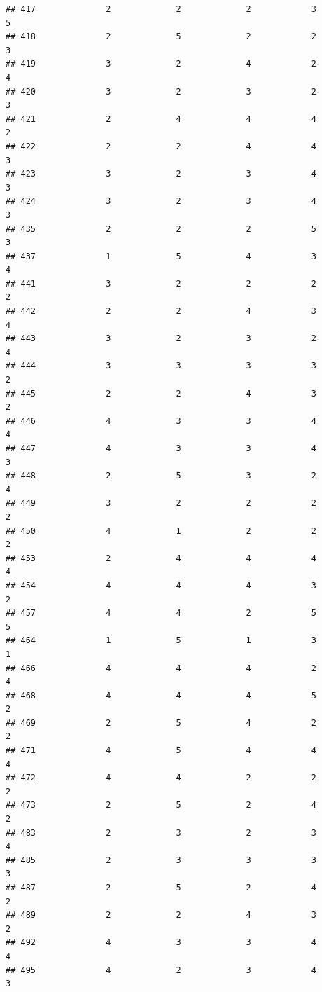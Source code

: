 \documentclass[
]{article}
\begin{document}
\begin{verbatim}
## 417              2             2             2            3          5
## 418              2             5             2            2          3
## 419              3             2             4            2          4
## 420              3             2             3            2          3
## 421              2             4             4            4          2
## 422              2             2             4            4          3
## 423              3             2             3            4          3
## 424              3             2             3            4          3
## 435              2             2             2            5          3
## 437              1             5             4            3          4
## 441              3             2             2            2          2
## 442              2             2             4            3          4
## 443              3             2             3            2          4
## 444              3             3             3            3          2
## 445              2             2             4            3          2
## 446              4             3             3            4          4
## 447              4             3             3            4          3
## 448              2             5             3            2          4
## 449              3             2             2            2          2
## 450              4             1             2            2          2
## 453              2             4             4            4          4
## 454              4             4             4            3          2
## 457              4             4             2            5          5
## 464              1             5             1            3          1
## 466              4             4             4            2          4
## 468              4             4             4            5          2
## 469              2             5             4            2          2
## 471              4             5             4            4          4
## 472              4             4             2            2          2
## 473              2             5             2            4          2
## 483              2             3             2            3          4
## 485              2             3             3            3          3
## 487              2             5             2            4          2
## 489              2             2             4            3          2
## 492              4             3             3            4          4
## 495              4             2             3            4          3

\end{verbatim}
\end{document}
